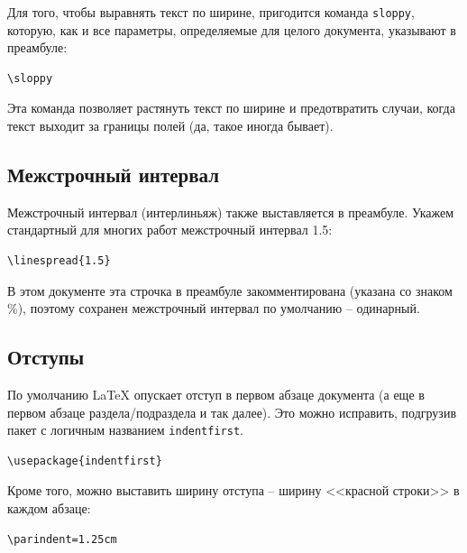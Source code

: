 \documentclass[12pt]{article}
\begin{document}
Для того, чтобы выравнять текст по ширине, пригодится команда \texttt{sloppy}, которую, как и все параметры, определяемые для целого документа, указывают в преамбуле:

\begin{center}
\begin{BVerbatim}
\sloppy
\end{BVerbatim} 
\end{center}

Эта команда позволяет растянуть текст по ширине и предотвратить случаи, когда текст выходит за границы полей (да, такое иногда бывает).

\subsection{Межстрочный интервал}

Межстрочный интервал (интерлиньяж) также выставляется в преамбуле. Укажем стандартный для многих работ межстрочный интервал 1.5: 

\begin{center}
\begin{BVerbatim}
\linespread{1.5}
\end{BVerbatim} 
\end{center}

В этом документе эта строчка в преамбуле закомментирована (указана со знаком \%), поэтому сохранен межстрочный интервал по умолчанию -- одинарный.

\subsection{Отступы}

По умолчанию \LaTeX{} опускает отступ в первом абзаце документа (а еще в первом абзаце раздела/подраздела и так далее). Это можно исправить, подгрузив пакет с логичным названием \texttt{indentfirst}. 

\begin{center}
\begin{BVerbatim}
\usepackage{indentfirst}
\end{BVerbatim} 
\end{center}

Кроме того, можно выставить ширину отступа -- ширину <<красной строки>> в каждом абзаце:

\begin{center}
\begin{BVerbatim}
\parindent=1.25cm
\end{BVerbatim} 
\end{center}
\end{document}
